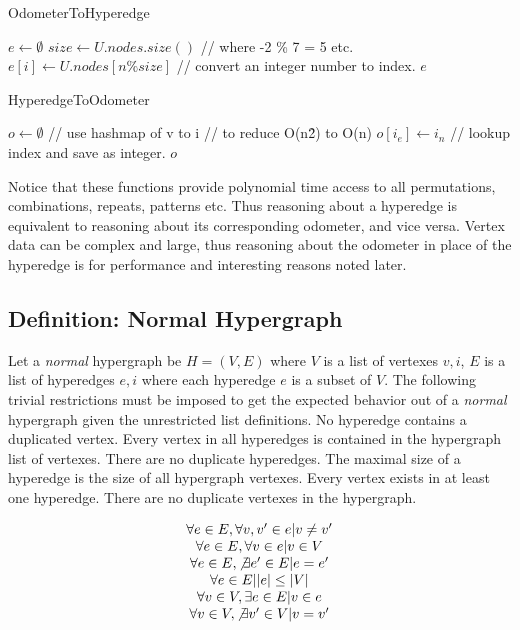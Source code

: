 \documentclass[10pt]{article}
\begin{document}
\begin{algorithm}
	\caption{OdometerToHyperedge}\label{euclid}
	\begin{algorithmic}[1]
		\State $e \gets \emptyset$
		\State $size \gets U.nodes.size()$
			\State // where -2 \% 7 = 5 etc. 
			\State $e[i] \gets U.nodes[ n \% size ]$ // convert an integer number to index.
		\EndFor
		\State \Return $e$
		\EndFunction
	\end{algorithmic}
\end{algorithm}
\begin{algorithm}
	\caption{HyperedgeToOdometer}\label{euclid}
	\begin{algorithmic}[1]
		\State $o \gets \emptyset$
		  // use hashmap of v to i
		 // to reduce O(n\^2) to O(n)
		\State $o[i_e] \gets i_n$ // lookup index and save as integer.
		\EndIf
		\EndFor
		\EndFor
		\State \Return $o$
		\EndFunction
	\end{algorithmic}
\end{algorithm}

Notice that these functions provide polynomial time access to all permutations, combinations, repeats, patterns etc. Thus reasoning about a hyperedge is equivalent to reasoning about its corresponding odometer, and vice versa. Vertex data can be complex and large, thus reasoning about the odometer in place of the hyperedge is for performance and interesting reasons noted later.
\newpage

\subsection{Definition: Normal Hypergraph ~\cite{Hypergraph:Book}}
Let a \textit{normal} hypergraph be $H = (V,E)$ where $V$ is a list of vertexes ${v,i}$, $E$ is a list of hyperedges ${e,i}$ where each hyperedge $e$ is a subset of $V$. The following trivial restrictions must be imposed to get the expected behavior out of a \textit{normal} hypergraph given the unrestricted list definitions. No hyperedge contains a duplicated vertex. Every vertex in all hyperedges is contained in the hypergraph list of vertexes. There are no duplicate hyperedges. The maximal size of a hyperedge is the size of all hypergraph vertexes. Every vertex exists in at least one hyperedge. There are no duplicate vertexes in the hypergraph.

\begin{equation*}
\begin{matrix}
	\forall e \in E , \forall v, v' \in e \vert v \ne v'\\
	\forall e \in E , \forall v \in e \vert v \in V\\
	\forall e \in E , \not\exists e' \in E \vert e = e'\\
	\forall e \in E \vert |e| \le |V|\\
	\forall v \in V , \exists e \in E \vert v \in e\\
	\forall v \in V , \not\exists v' \in V \vert v = v'\\
\end{matrix}
\end{equation*}
\end{document}
